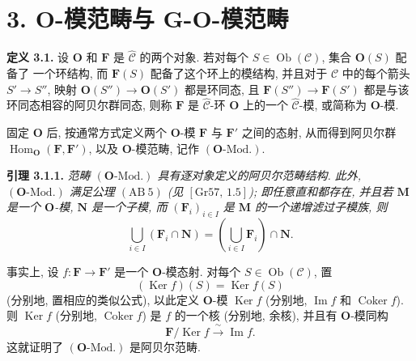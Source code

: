 
\section*{3. \(\mathbf O\)-模范畴与
\(\mathbf G\)-\(\mathbf O\)-模范畴}

\medskip
\noindent{}\textbf{定义 3.1.}
设 \(\mathbf O\) 和 \(\mathbf F\) 是
\(\widehat{\mathscr C}\) 的两个对象. 若对每个
\(S\in\operatorname{Ob}(\mathscr C)\), 集合 \(\mathbf O(S)\) 配备了
一个环结构, 而 \(\mathbf F(S)\) 配备了这个环上的模结构, 并且对于
\(\mathscr C\) 中的每个箭头 \(S'\to S''\), 映射
\(\mathbf O(S'')\to\mathbf O(S')\) 都是环同态, 且
\(\mathbf F(S'')\to\mathbf F(S')\) 都是与该环同态相容的阿贝尔群同态,
则称 \(\mathbf F\) 是 \(\widehat{\mathscr C}\)-环 \(\mathbf O\)
上的一个 \(\widehat{\mathscr C}\)-模, 或简称为 \(\mathbf O\)-模.

固定 \(\mathbf O\) 后, 按通常方式定义两个 \(\mathbf O\)-模
\(\mathbf F\) 与 \(\mathbf F'\) 之间的态射, 从而得到阿贝尔群
\(\operatorname{Hom}_{\mathbf O}(\mathbf F,\mathbf F')\),
以及 \(\mathbf O\)-模范畴, 记作 \((\mathbf O\text{-Mod.})\).

\medskip
\noindent{}\textbf{引理 3.1.1.}\footnotemark
\textit{范畴 \((\mathbf O\text{-Mod.})\) 具有逐对象定义的阿贝尔范畴结构.
此外, \((\mathbf O\text{-Mod.})\) 满足公理 \(\mathrm{(AB\ 5)}\)
(见 \([\mathrm{Gr}57,\,1.5]\)); 即任意直和都存在, 并且若
\(\mathbf M\) 是一个 \(\mathbf O\)-模, \(\mathbf N\) 是一个子模,
而 \((\mathbf F_i)_{i\in I}\) 是 \(\mathbf M\) 的一个递增滤过子模族, 则
\[
  \bigcup_{i\in I}(\mathbf F_i\cap\mathbf N)
    =\left(\bigcup_{i\in I}\mathbf F_i\right)\cap\mathbf N.
\]}

事实上, 设 \(f:\mathbf F\to\mathbf F'\) 是一个 \(\mathbf O\)-模态射.
对每个 \(S\in\operatorname{Ob}(\mathscr C)\), 置
\[
  (\operatorname{Ker}f)(S)=\operatorname{Ker}f(S)
\]
(分别地, 置相应的类似公式), 以此定义 \(\mathbf O\)-模
\(\operatorname{Ker}f\) (分别地,
\(\operatorname{Im}f\) 和 \(\operatorname{Coker}f\)).
则 \(\operatorname{Ker}f\) (分别地, \(\operatorname{Coker}f\))
是 \(f\) 的一个核 (分别地, 余核), 并且有 \(\mathbf O\)-模同构
\[
  \mathbf F/\operatorname{Ker}f
    \xrightarrow{\ \sim\ }\operatorname{Im}f.
\]
这就证明了 \((\mathbf O\text{-Mod.})\) 是阿贝尔范畴.

